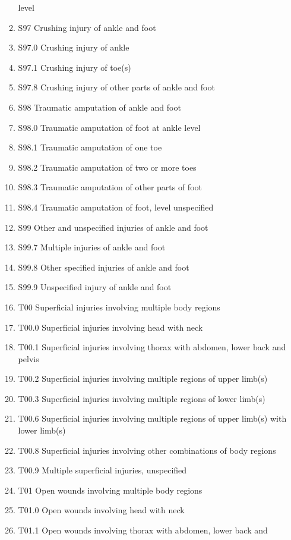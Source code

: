 \documentclass[
]{scrartcl}
\begin{document}
\begin{itemize}
\begin{enumerate}
    level
  \item
    S97 Crushing injury of ankle and foot
  \item
    S97.0 Crushing injury of ankle
  \item
    S97.1 Crushing injury of toe(s)
  \item
    S97.8 Crushing injury of other parts of ankle and foot
  \item
    S98 Traumatic amputation of ankle and foot
  \item
    S98.0 Traumatic amputation of foot at ankle level
  \item
    S98.1 Traumatic amputation of one toe
  \item
    S98.2 Traumatic amputation of two or more toes
  \item
    S98.3 Traumatic amputation of other parts of foot
  \item
    S98.4 Traumatic amputation of foot, level unspecified
  \item
    S99 Other and unspecified injuries of ankle and foot
  \item
    S99.7 Multiple injuries of ankle and foot
  \item
    S99.8 Other specified injuries of ankle and foot
  \item
    S99.9 Unspecified injury of ankle and foot
  \item
    T00 Superficial injuries involving multiple body regions
  \item
    T00.0 Superficial injuries involving head with neck
  \item
    T00.1 Superficial injuries involving thorax with abdomen, lower back
    and pelvis
  \item
    T00.2 Superficial injuries involving multiple regions of upper
    limb(s)
  \item
    T00.3 Superficial injuries involving multiple regions of lower
    limb(s)
  \item
    T00.6 Superficial injuries involving multiple regions of upper
    limb(s) with lower limb(s)
  \item
    T00.8 Superficial injuries involving other combinations of body
    regions
  \item
    T00.9 Multiple superficial injuries, unspecified
  \item
    T01 Open wounds involving multiple body regions
  \item
    T01.0 Open wounds involving head with neck
  \item
    T01.1 Open wounds involving thorax with abdomen, lower back and

\end{enumerate}
\end{itemize}
\end{document}
